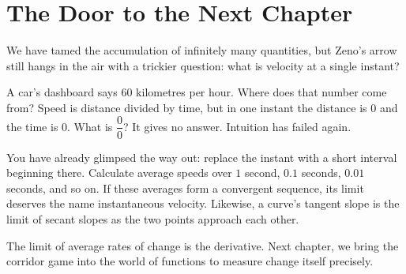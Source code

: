 \section*{The Door to the Next Chapter}

We have tamed the accumulation of infinitely many quantities, but Zeno's arrow still hangs in the air with a trickier question: what is velocity at a single instant?

A car's dashboard says $60$ kilometres per hour. Where does that number come from? Speed is distance divided by time, but in one instant the distance is $0$ and the time is $0$. What is $\dfrac{0}{0}$? It gives no answer. Intuition has failed again.

You have already glimpsed the way out: replace the instant with a short interval beginning there. Calculate average speeds over $1$ second, $0.1$ seconds, $0.01$ seconds, and so on. If these averages form a convergent sequence, its limit deserves the name instantaneous velocity. Likewise, a curve's tangent slope is the limit of secant slopes as the two points approach each other.

The limit of average rates of change is the derivative. Next chapter, we bring the corridor game into the world of functions to measure change itself precisely.
